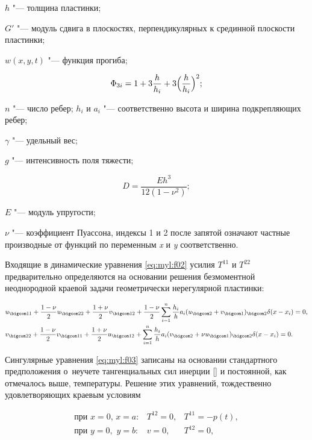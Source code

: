 $h$ "--- толщина пластинки; 

$G'$ "--- модуль сдвига в плоскостях, перпендикулярных к срединной плоскости пластинки; 

$w(x,y,t)$ "--- функция прогиба; 

$$\Phi_{3i}=1+3\frac{h}{h_i}+3\Bigl(\frac{h}{h_i}\Bigr)^2;$$ 

$n$ "--- число ребер; $h_i$ и $a_i$ "--- соответственно высота и ширина подкрепляющих ребер; 

$\gamma$ "--- удельный вес; 

$g$ "--- интенсивность поля тяжести; 

$$D=\frac{E h^3}{12(1-\nu^2)};$$ 

$E$ "--- модуль упругости; 

$\nu$ "--- коэффициент Пуассона, индексы 1 и 2 после запятой означают частные производные от функций по переменным \emph{x} и \emph{y} соответственно.





Входящие в динамические уравнения \eqref{eq:myl:f02} усилия $T^{11}$ и $T^{22}$ предварительно определяются на основании решения безмоментной неоднородной краевой задачи геометрически нерегулярной пластинки:

\begin{equation}\label{eq:myl:f03}

\begin{split}

&u_{\bigcom 11}+\frac{1-\nu}{2} u_{\bigcom 22}+\frac{1+\nu}{2}v_{\bigcom 12}+ \frac{1-\nu}{2} \sum_{i=1}^n \frac{h_{i}}{h}a_i(u_{\bigcom 2}+v_{\bigcom 1})_{\bigcom 2} \delta(x-x_i)=0,\\

&v_{\bigcom 22}+\frac{1-\nu}{2}v_{\bigcom 11}+\frac{1+\nu}{2}u_{\bigcom 12}+\sum_{i=1}^{n} \frac{h_i}{h} a_i (v_{\bigcom 2}+\nu u_{\bigcom 1})_{\bigcom 2} \delta(x-x_i)=0.

\end{split}

\end{equation}



Сингулярные уравнения \eqref{eq:myl:f03} записаны на основании стандартного предположения о~неучете тангенциальных сил инерции [] и постоянной, как отмечалось выше, температуры. Решение этих уравнений, тождественно удовлетворяющих краевым условиям

\begin{equation*}

\begin{array}{lrl}

\text{при} \,\,x=0, \,  x=a{:} & T^{12}=0, & T^{11}=-p(t),\\

\text{при} \,\, y=0,\,\, y=b{:} & v=0, & T^{12}=0,

\end{array}

\end{equation*}

